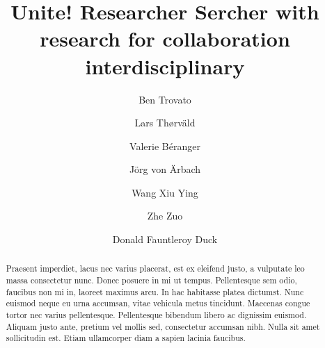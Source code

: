 \documentclass[sigconf, nonacm]{acmart}
\begin{document}
\title{Unite! Researcher Sercher with research for collaboration interdisciplinary}

\author{Ben Trovato}

\author{Lars Th{\o}rv{\"a}ld}

\author{Valerie B\'eranger}

\author{J\"org von \"Arbach}

\author{Wang Xiu Ying}
\author{Zhe Zuo}

\author{Donald Fauntleroy Duck}

\begin{abstract}
Praesent imperdiet, lacus nec varius placerat, est ex eleifend justo, a vulputate leo massa consectetur nunc. Donec posuere in mi ut tempus. Pellentesque sem odio, faucibus non mi in, laoreet maximus arcu. In hac habitasse platea dictumst. Nunc euismod neque eu urna accumsan, vitae vehicula metus tincidunt. Maecenas congue tortor nec varius pellentesque. Pellentesque bibendum libero ac dignissim euismod. Aliquam justo ante, pretium vel mollis sed, consectetur accumsan nibh. Nulla sit amet sollicitudin est. Etiam ullamcorper diam a sapien lacinia faucibus.
\end{abstract}

\maketitle
\end{document}
